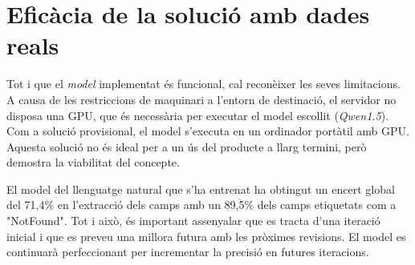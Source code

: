 \section{Eficàcia de la solució amb dades reals}


Tot i que el \textit{model} implementat és funcional, cal reconèixer les seves limitacions. A causa de les restriccions de maquinari a l'entorn de destinació, el servidor no disposa una GPU, que és necessària per executar el model escollit (\textit{Qwen1.5}). Com a solució provisional, el model s'executa en un ordinador portàtil amb GPU. Aquesta solució no és ideal per a un ús del producte a llarg termini, però demostra la viabilitat del concepte.

El model del llenguatge natural que s'ha entrenat ha obtingut un encert global del 71,4\% en l'extracció dels camps amb un 89,5\% dels camps etiquetats com a "NotFound". Tot i això, és important assenyalar que es tracta d'una iteració inicial i que es preveu una millora futura amb les pròximes revisions. El model es continuarà perfeccionant per incrementar la precisió en futures iteracions.
